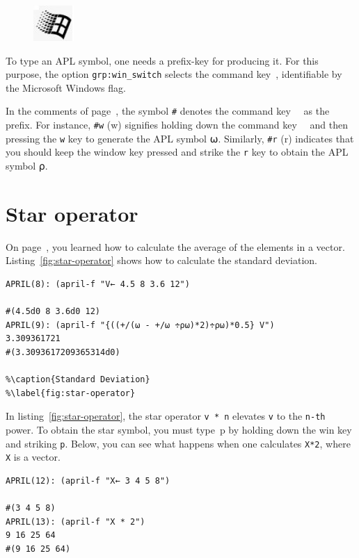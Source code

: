 \documentclass[a4paper,12pt]{book}
\begin{document}
\begin{figure}
\includegraphics{figs/window-key.jpg}
\end{figure}
To type an APL symbol, one needs a prefix-key
for producing it. For this purpose, the option
\verb|grp:win_switch| selects the
command key~\cmdkey,
identifiable by the Microsoft Windows flag.

In the comments of page~\pageref{april:install},
the symbol \verb|#| denotes the command
key~\cmdkey~ as the prefix.
For instance, \verb|#w| (\cmdkey w) signifies
holding down the command key~\cmdkey~ and then pressing
the \verb|w| key to generate the APL symbol ⍵.
Similarly, \verb|#r| (\cmdkey r) indicates
that you should keep the window key pressed
and strike the \verb|r| key
to obtain the APL symbol ⍴.

\section{Star operator}
On page~\pageref{april:install}, you learned
how to calculate the average of the elements
in a vector. Listing~\ref{fig:star-operator}
shows how to calculate the standard deviation.

\begin{lstlisting}[language=apl, label={fig:star-operator},
                    caption={Standard Deviation}]
APRIL(8): (april-f "V← 4.5 8 3.6 12")

#(4.5d0 8 3.6d0 12)
APRIL(9): (april-f "{((+/(⍵ - +/⍵ ÷⍴⍵)*2)÷⍴⍵)*0.5} V")
3.309361721
#(3.3093617209365314d0)

%\caption{Standard Deviation}
%\label{fig:star-operator}
\end{lstlisting}



In listing~\ref{fig:star-operator}, the star
operator \verb|v * n| elevates \verb|v| to
the \verb|n-th| power. To obtain the star symbol,
you must type~\cmdkey p by holding down the win
key and striking \verb|p|. Below, you can
see what happens when one calculates \verb|X*2|,
where \verb|X| is a vector.
\begin{lstlisting}[language=apl]
APRIL(12): (april-f "X← 3 4 5 8")

#(3 4 5 8)
APRIL(13): (april-f "X * 2")
9 16 25 64
#(9 16 25 64)
\end{lstlisting}
\end{document}
